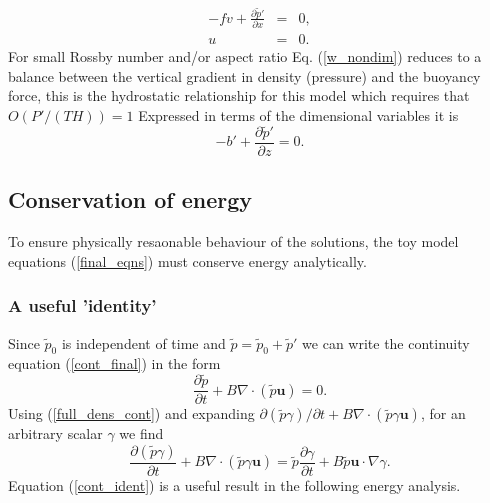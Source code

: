 \documentclass[times]{qjrms4}
\begin{document}
\begin{eqnarray} \label{geostrophic_bal_2}
 - fv +  \frac {\partial \tilde{p}'}{\partial x} &=& 0, \label{geostrophic_bal} \\
  u &=& 0 \label{geost_triv}.
\end{eqnarray}
For small Rossby number and/or aspect ratio Eq. (\ref{w_nondim}) 
reduces to a balance between the vertical gradient in
density (pressure) and the buoyancy force, this is the hydrostatic relationship for this model
which requires that $O \left( P'/(TH) \right) = 1$  
Expressed in terms of the dimensional variables it is
\begin{equation}\label{hydrostatic_bal}
 - b' + \frac {\partial \tilde{p}'}{\partial z} = 0.
\end{equation}



\subsection{Conservation of energy} \label{energy}

To ensure physically resaonable behaviour of the solutions, the toy model equations (\ref{final_eqns}) must conserve energy analytically.
 

\subsubsection{A useful 'identity'}

Since $\tilde{p}_0 $ is independent of time and $\tilde{p} = \tilde{p}_0 + \tilde{p}'$ we can write the continuity 
equation (\ref{cont_final}) in the form 
\begin{equation} 
\frac {\partial \tilde{p}}{\partial t} + B \nabla \cdot (\tilde{p} \mathbf u) = 0. \label{full_dens_cont}
\end{equation}
Using (\ref{full_dens_cont}) and expanding $ {\partial (\tilde{p} \gamma)}/{\partial t}  + B \nabla \cdot 
 (\tilde{p} \gamma \mathbf u ) $, for an arbitrary scalar $\gamma$ we find
 \begin{equation}\label{cont_ident}
    \frac {\partial (\tilde{p} \gamma)}{\partial t}  + B \nabla \cdot  (\tilde{p} \gamma \mathbf u ) 
    =
    \tilde{p} \frac { \partial \gamma}{ \partial t} + B \tilde{p} \mathbf u \cdot \nabla \gamma.
 \end{equation}
Equation (\ref{cont_ident}) is a useful result in the following energy analysis.
\end{document}
